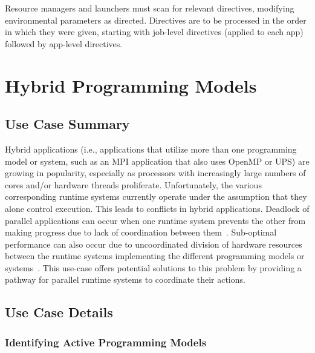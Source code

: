 


Resource managers and launchers must scan for relevant directives, modifying environmental parameters as directed. Directives are to be processed in the order in which they were given, starting with job-level directives (applied to each app) followed by app-level directives.

\section{Hybrid Programming Models}
\label{app:uc-hybrid-programming-models}

\subsection{Use Case Summary}

Hybrid applications (i.e., applications that utilize more than one programming model or system, such as an MPI application that also uses OpenMP or UPS) are growing in popularity, especially as processors with increasingly large numbers of cores and/or hardware threads proliferate. Unfortunately, the various corresponding runtime systems currently operate under the assumption that they alone control execution. This leads to conflicts in hybrid applications. Deadlock of parallel applications can occur when one runtime system prevents the other from making progress due to lack of coordination between them~\cite{2016:Hamidouche}.  Sub-optimal performance can also occur due to uncoordinated division of hardware resources between the runtime systems implementing the different programming models or systems~\cite{2018:Vallee,ompix-moc}. This use-case offers potential solutions to this
problem by providing a pathway for parallel runtime systems to coordinate their actions.

\subsection{Use Case Details}

\subsubsection{Identifying Active Programming Models}

